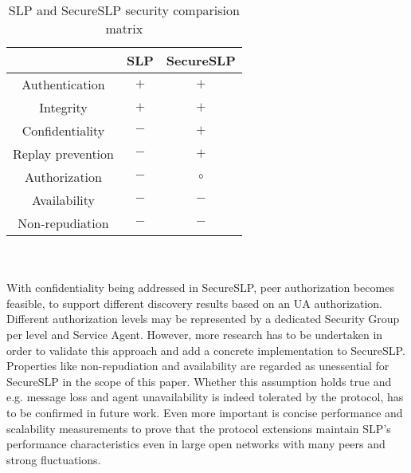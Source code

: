 \begin{table}[!h]
\begin{centering}
\begin{tabular}{|c|c|c|}
\hline 
 & SLP & SecureSLP
\tabularnewline
\hline
\hline 
Authentication & $+$ & $+$
\tabularnewline
\hline 
Integrity & $+$ & $+$
\tabularnewline
\hline 
Confidentiality & $-$ & $+$
\tabularnewline
\hline 
Replay prevention & $-$ & $+$
\tabularnewline
\hline 
Authorization & $-$ & $\circ$
\tabularnewline
\hline 
Availability & $-$ & $-$
\tabularnewline
\hline 
Non-repudiation & $-$ & $-$
\tabularnewline
\hline
\end{tabular}
\par\end{centering}

\caption{\label{tab:SLP-and-SecureSLP}SLP and SecureSLP security comparision matrix}
\end{table}\\\\
With confidentiality being addressed in SecureSLP, peer authorization becomes feasible, to support different discovery results based on an UA authorization. Different authorization levels may be represented by a dedicated Security Group per level and Service Agent. However, more research has to be undertaken in order to validate this approach and add a concrete implementation to SecureSLP.\\
Properties like non-repudiation and availability are regarded as unessential for SecureSLP in the scope of this paper. Whether this assumption holds true and e.g. message loss and agent unavailability is indeed tolerated by the protocol, has to be confirmed in future work. Even more important is concise performance and scalability measurements to prove that the protocol extensions maintain SLP's performance characteristics even in large open networks with many peers and strong fluctuations.